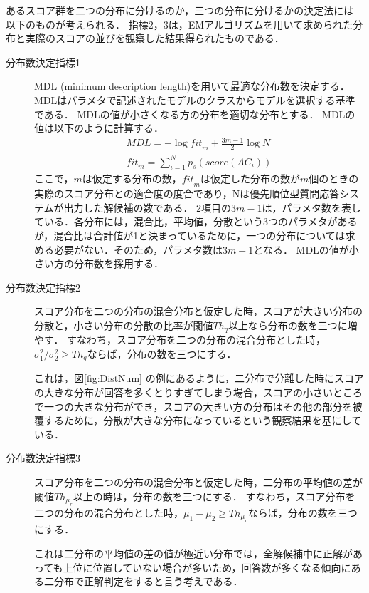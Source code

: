 \documentclass[japanese]{jnlp_1.4}
\begin{document}
あるスコア群を二つの分布に分けるのか，三つの分布に分けるかの決定法には
以下のものが考えられる．
指標2，3は，EMアルゴリズムを用いて求められた分布と実際のスコアの並びを観察した結果得られたものである．

\begin{description}
\item [分布数決定指標1] MDL (minimum description length)\cite{MDL}を用いて最適な分布数を決定する．
MDLはパラメタで記述されたモデルのクラスからモデルを選択する基準である．
MDLの値が小さくなる方の分布を適切な分布とする．
MDLの値は以下のように計算する．
\begin{gather}
 MDL = - \log \mathit{\mathit{fit}}_m + \frac{3m-1}{2} \log N\\
 \mathit{fit}_m = \sum^{N}_{i=1} p_s(score(AC_i))\nonumber
\end{gather}
ここで，$m$は仮定する分布の数，$\mathit{fit}_m$は仮定した分布の数が$m$個のときの実際のスコア分布との適合度の度合であり，Nは優先順位型質問応答システムが出力した解候補の数である．
2項目の$3m-1$は，パラメタ数を表している．各分布には，混合比，平均値，分散という3つのパラメタがあるが，混合比は合計値が1と決まっているために，一つの分布については求める必要がない．そのため，パラメタ数は$3m-1$となる．
MDLの値が小さい方の分布数を採用する．

\item [分布数決定指標2] スコア分布を二つの分布の混合分布と仮定した時，スコアが大きい分布の分散と，小さい分布の分散の比率が閾値$Th_q$以上なら分布の数を三つに増やす． 
すなわち，スコア分布を二つの分布の混合分布とした時，$\sigma_1^2/\sigma_2^2 \ge Th_q$ならば，分布の数を三つにする．

これは，図\ref{fig:DistNum}
の例にあるように，二分布で分離した時にスコアの大きな分布が回答を多くとりすぎてしまう場合，スコアの小さいところで一つの大きな分布ができ，スコアの大きい方の分布はその他の部分を被覆するために，分散が大きな分布になっているという観察結果を基にしている．

\item [分布数決定指標3] スコア分布を二つの分布の混合分布と仮定した時，二分布の平均値の差が
閾値$Th_{\mu_r}$以上の時は，分布の数を三つにする．
すなわち，スコア分布を二つの分布の混合分布とした時，$\mu_1-\mu_2 \ge Th_{\mu_r}$ならば，分布の数を三つにする．

これは二分布の平均値の差の値が極近い分布では，全解候補中に正解があっても上位に位置していない場合が多いため，回答数が多くなる傾向にある二分布で正解判定をすると言う考えである．
\end{description}
\end{document}
